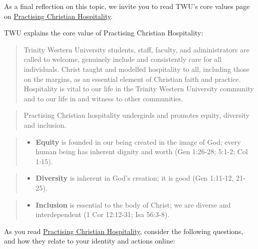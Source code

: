 \documentclass[
]{book}
\providecommand{\tightlist}{%
  \setlength{\itemsep}{0pt}\setlength{\parskip}{0pt}}
\theoremstyle{definition}
\theoremstyle{definition}
\theoremstyle{definition}
\theoremstyle{definition}
\theoremstyle{remark}
\begin{document}
\begin{reflect}
As a final reflection on this topic, we invite you to read TWU's core values page on \href{https://www.twu.ca/about-us/commitments/core-values/practising-christian-hospitality}{Practising Christian Hospitality}.

TWU explains the core value of Practising Christian Hospitality:

\begin{quote}
Trinity Western University students, staff, faculty, and administrators are called to welcome, genuinely include and consistently care for all individuals. Christ taught and modelled hospitality to all, including those on the margins, as an essential element of Christian faith and practice. Hospitality is vital to our life in the Trinity Western University community and to our life in and witness to other communities.
\end{quote}

\begin{quote}
Practising Christian hospitality undergirds and promotes equity, diversity and inclusion.
\end{quote}

\begin{quote}
\begin{itemize}
\tightlist
\item
  \textbf{Equity} is founded in our being created in the image of God; every human being has inherent dignity and worth (Gen 1:26-28; 5:1-2; Col 1:15).
\end{itemize}
\end{quote}

\begin{quote}
\begin{itemize}
\tightlist
\item
  \textbf{Diversity} is inherent in God's creation; it is good (Gen 1:11-12, 21-25).
\end{itemize}
\end{quote}

\begin{quote}
\begin{itemize}
\tightlist
\item
  \textbf{Inclusion} is essential to the body of Christ; we are diverse and interdependent (1 Cor 12:12-31; Isa 56:3-8).
\end{itemize}
\end{quote}

As you read \href{https://www.twu.ca/about-us/commitments/core-values/practising-christian-hospitality}{Practising Christian Hospitality}, consider the following questions, and how they relate to your identity and actions online:


\end{reflect}
\end{document}
